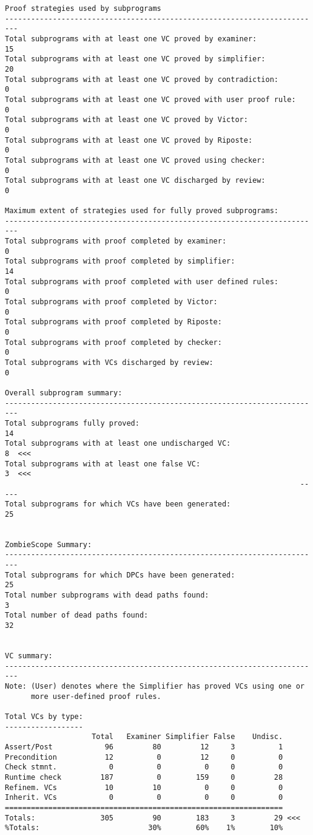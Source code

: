 \begin{lstlisting}[frame=single, gobble=0, caption={POGS report for PCA Pump prototype}]
Proof strategies used by subprograms
-------------------------------------------------------------------------
Total subprograms with at least one VC proved by examiner:             15
Total subprograms with at least one VC proved by simplifier:           20
Total subprograms with at least one VC proved by contradiction:         0
Total subprograms with at least one VC proved with user proof rule:     0
Total subprograms with at least one VC proved by Victor:                0
Total subprograms with at least one VC proved by Riposte:               0
Total subprograms with at least one VC proved using checker:            0
Total subprograms with at least one VC discharged by review:            0

Maximum extent of strategies used for fully proved subprograms:
-------------------------------------------------------------------------
Total subprograms with proof completed by examiner:                     0
Total subprograms with proof completed by simplifier:                  14
Total subprograms with proof completed with user defined rules:         0
Total subprograms with proof completed by Victor:                       0
Total subprograms with proof completed by Riposte:                      0
Total subprograms with proof completed by checker:                      0
Total subprograms with VCs discharged by review:                        0

Overall subprogram summary:
-------------------------------------------------------------------------
Total subprograms fully proved:                                        14
Total subprograms with at least one undischarged VC:                    8  <<<
Total subprograms with at least one false VC:                           3  <<<
                                                                    -----
Total subprograms for which VCs have been generated:                   25


ZombieScope Summary:
-------------------------------------------------------------------------
Total subprograms for which DPCs have been generated:                  25
Total number subprograms with dead paths found:                         3
Total number of dead paths found:                                      32


VC summary:
-------------------------------------------------------------------------
Note: (User) denotes where the Simplifier has proved VCs using one or
      more user-defined proof rules.

Total VCs by type:
------------------
                    Total   Examiner Simplifier False    Undisc.
Assert/Post            96         80         12     3          1
Precondition           12          0         12     0          0
Check stmnt.            0          0          0     0          0
Runtime check         187          0        159     0         28
Refinem. VCs           10         10          0     0          0
Inherit. VCs            0          0          0     0          0
================================================================
Totals:               305         90        183     3         29 <<<
%Totals:                         30%        60%    1%        10%


\end{lstlisting}

